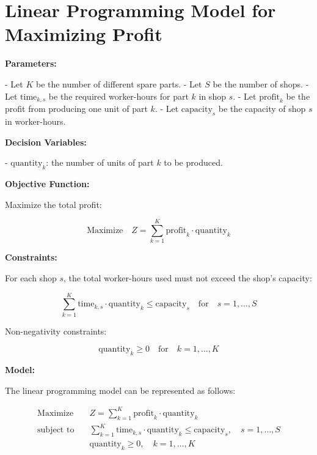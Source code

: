 \documentclass{article}
\begin{document}
\section*{Linear Programming Model for Maximizing Profit}

\textbf{Parameters:}

- Let \( K \) be the number of different spare parts.
- Let \( S \) be the number of shops.
- Let \( \text{time}_{k,s} \) be the required worker-hours for part \( k \) in shop \( s \).
- Let \( \text{profit}_{k} \) be the profit from producing one unit of part \( k \).
- Let \( \text{capacity}_{s} \) be the capacity of shop \( s \) in worker-hours.

\textbf{Decision Variables:}

- \( \text{quantity}_{k} \): the number of units of part \( k \) to be produced.

\textbf{Objective Function:}

Maximize the total profit:

\[
\text{Maximize} \quad Z = \sum_{k=1}^{K} \text{profit}_{k} \cdot \text{quantity}_{k}
\]

\textbf{Constraints:}

For each shop \( s \), the total worker-hours used must not exceed the shop's capacity:

\[
\sum_{k=1}^{K} \text{time}_{k,s} \cdot \text{quantity}_{k} \leq \text{capacity}_{s} \quad \text{for} \quad s = 1, \ldots, S
\]

Non-negativity constraints:

\[
\text{quantity}_{k} \geq 0 \quad \text{for} \quad k = 1, \ldots, K
\]

\textbf{Model:}

The linear programming model can be represented as follows:

\[
\begin{align*}
\text{Maximize} \quad & Z = \sum_{k=1}^{K} \text{profit}_{k} \cdot \text{quantity}_{k} \\
\text{subject to} \quad & \sum_{k=1}^{K} \text{time}_{k,s} \cdot \text{quantity}_{k} \leq \text{capacity}_{s}, \quad s = 1, \ldots, S \\
& \text{quantity}_{k} \geq 0, \quad k = 1, \ldots, K
\end{align*}
\]
\end{document}
